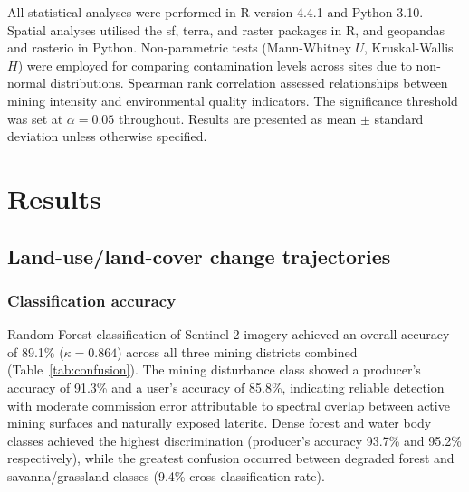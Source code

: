\documentclass[preprint,12pt,authoryear]{elsarticle}
\begin{document}
All statistical analyses were performed in R version 4.4.1 \citep{RCoreTeam2024} and Python 3.10. Spatial analyses utilised the sf, terra, and raster packages in R, and geopandas and rasterio in Python. Non-parametric tests (Mann-Whitney $U$, Kruskal-Wallis $H$) were employed for comparing contamination levels across sites due to non-normal distributions. Spearman rank correlation assessed relationships between mining intensity and environmental quality indicators. The significance threshold was set at $\alpha = 0.05$ throughout. Results are presented as mean $\pm$ standard deviation unless otherwise specified.


\section{Results}

\subsection{Land-use/land-cover change trajectories}

\subsubsection{Classification accuracy}

Random Forest classification of Sentinel-2 imagery achieved an overall accuracy of 89.1\% ($\kappa = 0.864$) across all three mining districts combined (Table~\ref{tab:confusion}). The mining disturbance class showed a producer's accuracy of 91.3\% and a user's accuracy of 85.8\%, indicating reliable detection with moderate commission error attributable to spectral overlap between active mining surfaces and naturally exposed laterite. Dense forest and water body classes achieved the highest discrimination (producer's accuracy 93.7\% and 95.2\% respectively), while the greatest confusion occurred between degraded forest and savanna/grassland classes (9.4\% cross-classification rate).
\end{document}
